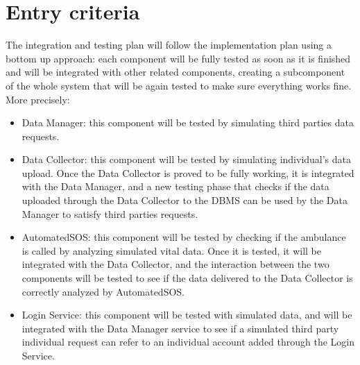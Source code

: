 \section{Entry criteria}
The integration and testing plan will follow the implementation plan using a bottom up approach: each component will be fully tested as soon as it is finished and will be integrated with other related components, creating a subcomponent of the whole system that will be again tested to make sure everything works fine.
More precisely:
\begin{itemize}
\item Data Manager: this component will be tested by simulating third parties data requests.
\item Data Collector: this component will be tested by simulating individual's data upload. Once the Data Collector is proved to be fully working, it is integrated with the Data Manager, and a new testing phase that checks if the data uploaded through the Data Collector to the DBMS can be used by the Data Manager to satisfy third parties requests.
\item AutomatedSOS: this component will be tested by checking if the ambulance is called by analyzing simulated vital data. Once it is tested, it will be integrated with the Data Collector, and the interaction between the two components will be tested to see if the data delivered to the Data Collector is correctly analyzed by AutomatedSOS.
\item Login Service: this component will be tested with simulated data, and will be integrated with the Data Manager service to see if a simulated third party individual request can refer to an individual account added through the Login Service.
\end{itemize}